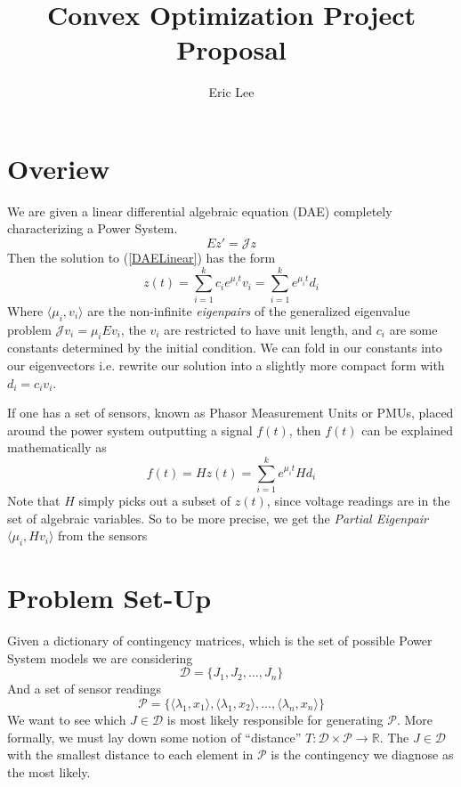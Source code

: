 

\title{Convex Optimization Project Proposal}
\author{Eric Lee }
\date{}


\maketitle
{}
\section{Overiew}
We are given a linear differential algebraic equation (DAE) completely characterizing a Power System. 
\begin{equation} \label{DAELinear}
Ez' = \mathcal{J} z
\end{equation}
Then the solution to (\ref{DAELinear}) has the form
\begin{equation}\label{DAESolution}
z(t) = \sum_{i = 1}^{k} c_i e^{\mu_it}v_i = \sum_{i = 1}^{k} e^{\mu_it}d_i
\end{equation}
Where $\langle \mu_i,v_i \rangle$ are the non-infinite \textit{eigenpairs} of the generalized eigenvalue problem $\mathcal{J} v_i = \mu_i Ev_i $, the $v_i$ are restricted to have unit length, and $c_i$ are some constants determined by the initial condition. We can fold in our constants into our eigenvectors i.e. rewrite our solution into a slightly more compact form with $d_i = c_i v_i$. 

If one has a set of sensors, known as Phasor Measurement Units or PMUs, placed around the power system outputting a signal $f(t)$, then $f(t)$ can be explained mathematically as 
\begin{equation}\label{PMUSolution}
f(t) = Hz(t) = \sum_{i = 1}^{k} e^{\mu_it}Hd_i
\end{equation}
Note that $H$ simply picks out a subset of $z(t)$, since voltage readings are in the set of algebraic variables. So to be more precise, we get the \textit{Partial Eigenpair}
$\langle \mu_i,Hv_i \rangle$ from the sensors


\section{Problem Set-Up}
Given a dictionary of contingency matrices, which is the set of possible Power System models we are considering
$$ \mathcal{D} =  \{ J_1, J_2, \dots, J_n \} $$
And a set of sensor readings 
$$ \mathcal{P} =  \{ \langle \lambda_1,x_1 \rangle, \langle \lambda_1,x_2 \rangle, \dots, \langle \lambda_n,x_n \rangle \} $$
We want to see which $J \in \mathcal{D}$ is most likely responsible for generating $\mathcal{P}$. More formally, 
we must lay down some notion of ``distance'' $T: \mathcal{D} \times \mathcal{P} \rightarrow \mathbb{R}$. The $J \in \mathcal{D}$ with the smallest distance to each element in $\mathcal{P}$ is the contingency we diagnose as the most likely. 

